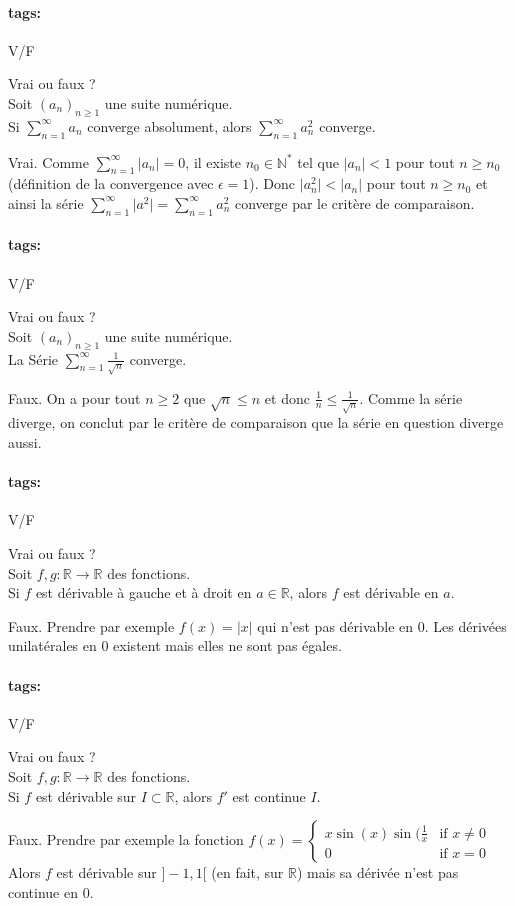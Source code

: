 \documentclass[12pt]{article}
\newcommand*{\xfield}[1]{\begin{mdframed}\centering #1\end{mdframed}\bigskip}
\newenvironment{note}{}{}
\newcommand*{\tags}[1]{\paragraph{tags: }#1}
\begin{document}
\begin{note}
\tags{V/F}
	\xfield{Vrai ou faux ?\\
	Soit $(a_n)_{n\ge 1}$ une suite numérique.\\
	Si $\sum\limits^{\infty}_{n=1} a_n$ converge absolument, alors $\sum\limits^{\infty}_{n=1} a^2_n$ converge.}
	\xfield{Vrai. Comme $\sum\limits^{\infty}_{n=1} \vert a_n \vert = 0$, il existe $n_0 \in \mathbb{N}^*$ tel que $\vert a_n\vert < 1$ pour tout $n \ge n_0$ (définition de la convergence avec $\epsilon = 1$). Donc $\vert a_n^2\vert < \vert a_n \vert$ pour tout $n\ge n_0$ et ainsi la série $\sum\limits^{\infty}_{n=1} \vert a^2\vert = \sum\limits^{\infty}_{n=1} a^2_n$ converge par le critère de comparaison.}
\end{note}

\begin{note}
\tags{V/F}
	\xfield{Vrai ou faux ?\\
	Soit $(a_n)_{n\ge 1}$ une suite numérique.\\
	La Série $\sum\limits^{\infty}_{n=1} \frac{1}{\sqrt{n}}$ converge.}
	\xfield{Faux. On a pour tout $n \ge 2$ que $\sqrt{n} \le n$ et donc $\frac{1}{n} \le \frac{1}{\sqrt{n}}$. Comme la série diverge, on conclut par le critère de comparaison que la série en question diverge aussi.}
\end{note}


\begin{note}
\tags{V/F}
	\xfield{Vrai ou faux ?\\
	Soit $f,g: \mathbb{R} \to \mathbb{R}$ des fonctions.\\
	Si $f$ est dérivable à gauche et à droit en $a \in \mathbb{R}$, alors $f$ est dérivable en $a$.}
	\xfield{Faux. Prendre par exemple $f(x) = \vert x \vert$ qui n'est pas dérivable en 0. Les dérivées unilatérales en 0 existent mais elles ne sont pas égales.}
\end{note}

\begin{note}
\tags{V/F}
	\xfield{Vrai ou faux ?\\
	Soit $f,g: \mathbb{R} \to \mathbb{R}$ des fonctions.\\
	Si $f$ est dérivable sur $I \subset\mathbb{R}$, alors $f'$ est continue $I$.}
	\xfield{Faux. Prendre par exemple la fonction $f(x) = \left\{
	 \begin{array}{ll}
		x\sin(x)\sin(\frac{1}{x}  & \mbox{if } x \neq 0 \\
		0 & \mbox{if } x = 0
	\end{array}
\right.$Alors $f$ est dérivable sur $]-1,1[$ (en fait, sur $\mathbb{R}$) mais sa dérivée n'est pas continue en 0.}
\end{note}
\end{document}
